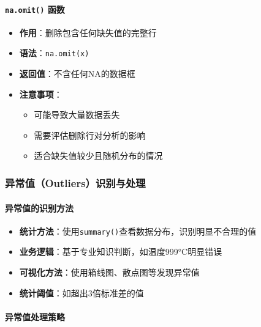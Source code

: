\documentclass[
]{book}
\providecommand{\tightlist}{%
  \setlength{\itemsep}{0pt}\setlength{\parskip}{0pt}}
\begin{document}
\hypertarget{na.omit-ux51fdux6570}{%
\paragraph{\texorpdfstring{\texttt{na.omit()} 函数}{na.omit() 函数}}\label{na.omit-ux51fdux6570}}

\begin{itemize}
\tightlist
\item
  \textbf{作用}：删除包含任何缺失值的完整行
\item
  \textbf{语法}：\texttt{na.omit(x)}
\item
  \textbf{返回值}：不含任何NA的数据框
\item
  \textbf{注意事项}：

  \begin{itemize}
  \tightlist
  \item
    可能导致大量数据丢失
  \item
    需要评估删除行对分析的影响
  \item
    适合缺失值较少且随机分布的情况
  \end{itemize}
\end{itemize}

\hypertarget{ux5f02ux5e38ux503coutliersux8bc6ux522bux4e0eux5904ux7406}{%
\subsubsection{异常值（Outliers）识别与处理}\label{ux5f02ux5e38ux503coutliersux8bc6ux522bux4e0eux5904ux7406}}

\hypertarget{ux5f02ux5e38ux503cux7684ux8bc6ux522bux65b9ux6cd5}{%
\paragraph{异常值的识别方法}\label{ux5f02ux5e38ux503cux7684ux8bc6ux522bux65b9ux6cd5}}

\begin{itemize}
\tightlist
\item
  \textbf{统计方法}：使用\texttt{summary()}查看数据分布，识别明显不合理的值
\item
  \textbf{业务逻辑}：基于专业知识判断，如温度999°C明显错误
\item
  \textbf{可视化方法}：使用箱线图、散点图等发现异常值
\item
  \textbf{统计阈值}：如超出3倍标准差的值
\end{itemize}

\hypertarget{ux5f02ux5e38ux503cux5904ux7406ux7b56ux7565}{%
\paragraph{异常值处理策略}\label{ux5f02ux5e38ux503cux5904ux7406ux7b56ux7565}}
\end{document}
